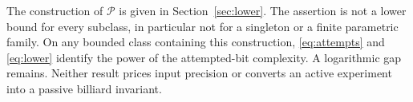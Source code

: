 The construction of $\mathcal P$ is given in Section~\ref{sec:lower}.
The assertion is not a lower bound for every subclass, in particular
not for a singleton or a finite parametric family. On any bounded
class containing this construction, \eqref{eq:attempts} and
\eqref{eq:lower} identify the power of the attempted-bit complexity.
A logarithmic gap remains. Neither result prices input precision or
converts an active experiment into a passive billiard invariant.

